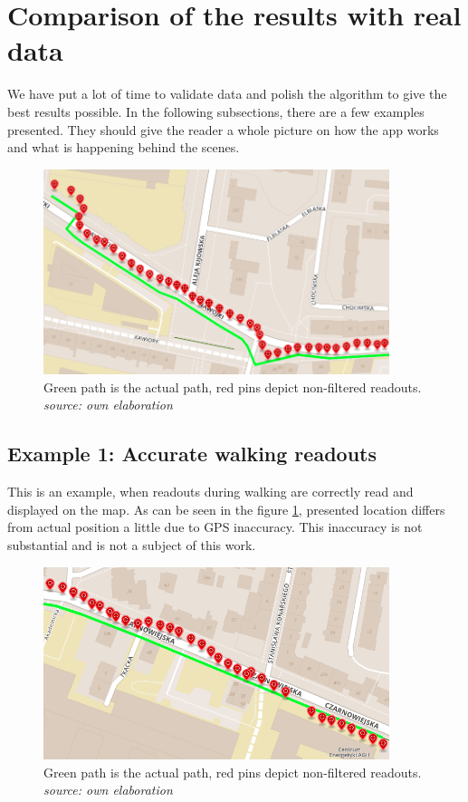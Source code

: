 \section{Comparison of the results with real data}

We have put a lot of time to validate data and polish the algorithm to give the best results possible. In the following subsections, there are a few examples presented. They should give the reader a whole picture on how the app works and what is happening behind the scenes.

\begin{figure}[]
    \includegraphics[width=0.9\textwidth]{images/1.png}
    \caption{Green path is the actual path, red pins depict non-filtered readouts. \\ \textit{source: own elaboration}}
    \label{fig:screenexample1}
\end{figure}

\subsection{Example 1: Accurate walking readouts}

This is an example, when readouts during walking are correctly read and displayed on the map. As can be seen in the figure \ref{fig:screenexample1}, presented location differs from actual position a little due to GPS inaccuracy. This inaccuracy is not substantial and is not a subject of this work.

\begin{figure}[]
    \includegraphics[width=0.9\textwidth]{images/1-1.png}
    \caption{Green path is the actual path, red pins depict non-filtered readouts. \\ \textit{source: own elaboration}}
    \label{fig:screenexample11}
\end{figure}

